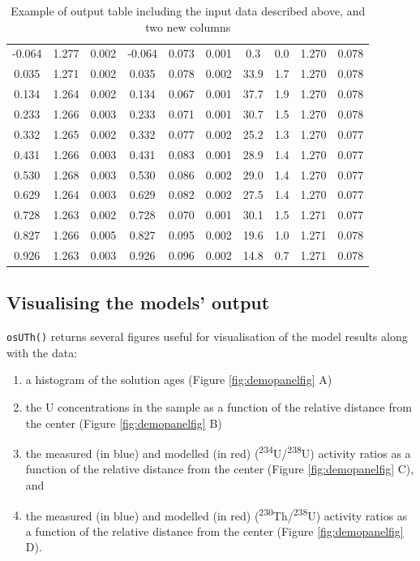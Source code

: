 \documentclass[]{elsarticle} %
\providecommand{\tightlist}{%
  \setlength{\itemsep}{0pt}\setlength{\parskip}{0pt}}
\begin{document}
\begin{table}[ht]
\begin{tabular}{cccccccccc}
  -0.064 & 1.277 & 0.002 & -0.064 & 0.073 & 0.001 & 0.3 & 0.0 & 1.270 & 0.078 \\ 
  0.035 & 1.271 & 0.002 & 0.035 & 0.078 & 0.002 & 33.9 & 1.7 & 1.270 & 0.078 \\ 
  0.134 & 1.264 & 0.002 & 0.134 & 0.067 & 0.001 & 37.7 & 1.9 & 1.270 & 0.078 \\ 
  0.233 & 1.266 & 0.003 & 0.233 & 0.071 & 0.001 & 30.7 & 1.5 & 1.270 & 0.078 \\ 
  0.332 & 1.265 & 0.002 & 0.332 & 0.077 & 0.002 & 25.2 & 1.3 & 1.270 & 0.077 \\ 
  0.431 & 1.266 & 0.003 & 0.431 & 0.083 & 0.001 & 28.9 & 1.4 & 1.270 & 0.077 \\ 
  0.530 & 1.268 & 0.003 & 0.530 & 0.086 & 0.002 & 29.0 & 1.4 & 1.270 & 0.077 \\ 
  0.629 & 1.264 & 0.003 & 0.629 & 0.082 & 0.002 & 27.5 & 1.4 & 1.270 & 0.077 \\ 
  0.728 & 1.263 & 0.002 & 0.728 & 0.070 & 0.001 & 30.1 & 1.5 & 1.271 & 0.077 \\ 
  0.827 & 1.266 & 0.005 & 0.827 & 0.095 & 0.002 & 19.6 & 1.0 & 1.271 & 0.078 \\ 
  0.926 & 1.263 & 0.003 & 0.926 & 0.096 & 0.002 & 14.8 & 0.7 & 1.271 & 0.078 \\ 
   \hline
\end{tabular}
\caption{\label{tab:outputdata}Example of output table including the input data described above, and two new columns} 
\end{table}

\hypertarget{visualising-the-models-output}{%
\subsection{Visualising the models' output}\label{visualising-the-models-output}}

\texttt{osUTh()} returns several figures useful for visualisation of the model results along with the data:

\begin{enumerate}
\def\labelenumi{\arabic{enumi}.}
\tightlist
\item
  a histogram of the solution ages (Figure \ref{fig:demopanelfig} A)
\item
  the U concentrations in the sample as a function of the relative distance from the center (Figure \ref{fig:demopanelfig} B)
\item
  the measured (in blue) and modelled (in red) (\textsuperscript{234}U/\textsuperscript{238}U) activity ratios as a function of the relative distance from the center (Figure \ref{fig:demopanelfig} C), and
\item
  the measured (in blue) and modelled (in red) (\textsuperscript{230}Th/\textsuperscript{238}U) activity ratios as a function of the relative distance from the center (Figure \ref{fig:demopanelfig} D).
\end{enumerate}
\end{document}
